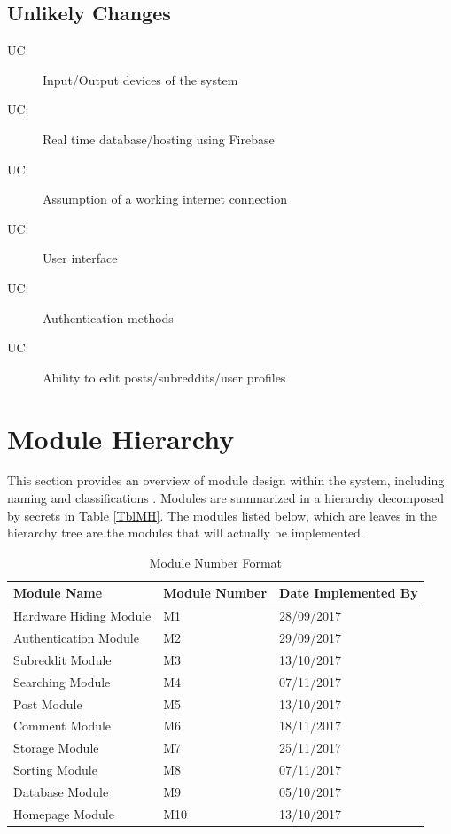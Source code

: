 \documentclass[12pt,fleqn]{article}
\newcounter{ucnum}
\newcommand{\uctheucnum}{UC\theucnum}
\begin{document}
\subsection{Unlikely Changes} \label{SecUchange}
\begin{description}
\item[ \uctheucnum:] Input/Output devices of the system
\item[ \uctheucnum:] Real time database/hosting using Firebase
\item[ \uctheucnum:] Assumption of a working internet connection
\item[ \uctheucnum:] User interface
\item[ \uctheucnum:] Authentication methods
\item[ \uctheucnum:] Ability to edit posts/subreddits/user profiles
\end{description}

\section{Module Hierarchy} \label{sec:hierarchy}

This section provides an overview of module design within the system, including naming and classifications . Modules are summarized
in a hierarchy decomposed by secrets in Table \ref{TblMH}. The modules listed
below, which are leaves in the hierarchy tree are the modules that will
actually be implemented.

\begin{table}[!htbp]
	\begin{tabular}{lll}
		\toprule
		Module Name & Module Number & Date Implemented By \\
		\midrule
		Hardware Hiding Module & M1 & 28/09/2017\\
		\midrule
		Authentication Module & M2 & 29/09/2017 \\
		\midrule
		Subreddit Module & M3 & 13/10/2017\\
		\midrule
		Searching Module & M4 & 07/11/2017\\
		\midrule
		Post Module & M5 & 13/10/2017\\
		\midrule
		Comment Module & M6 & 18/11/2017\\
		\midrule
		Storage Module & M7 & 25/11/2017\\
		\midrule
		Sorting Module & M8 & 07/11/2017\\
		\midrule
		Database Module & M9 & 05/10/2017\\
		\midrule
		\leavevmode\color{red}Homepage Module & \leavevmode\color{red}M10 & \leavevmode\color{red}13/10/2017\\
		\bottomrule
	\end{tabular}
	\caption{Module Number Format}
	\makeatletter
	\def\rulecolor#1#{\CT@arc{#1}}
	\def\CT@arc#1#2{%
		\ifdim\baselineskip=\z@\noalign\fi
		{\gdef\CT@arc@{\color#1{#2}}}}
	\let\CT@arc@\relax
	\makeatother
	\label{Table 1}
\end{table}
\end{document}
